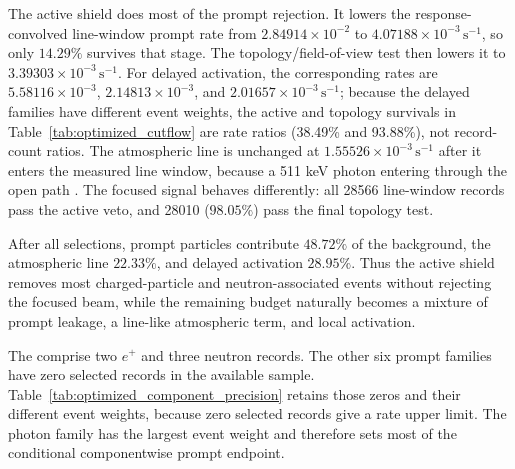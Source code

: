 \documentclass[11pt]{article}
\newcommand{\cps}{\ensuremath{\,\mathrm{s^{-1}}}}
\begin{document}
The active shield does most of the prompt rejection. It lowers the response-convolved
line-window prompt rate from $2.84914\times10^{-2}$ to
$4.07188\times10^{-3}\cps$, so only $14.29\%$ survives that stage. The topology/field-of-view test then lowers
it to $3.39303\times10^{-3}\cps$. For delayed activation, the corresponding
rates are $5.58116\times10^{-3}$, $2.14813\times10^{-3}$, and
$2.01657\times10^{-3}\cps$; because the delayed families have different event
weights, the active and topology survivals in Table~\ref{tab:optimized_cutflow}
are rate ratios (38.49\% and 93.88\%), not record-count ratios. The atmospheric line is unchanged at
$1.55526\times10^{-3}\cps$ after it enters the measured line window, because a 511 keV photon entering through the open
path . The focused signal behaves differently:
all 28566 line-window records pass the active veto, and 28010 ($98.05\%$) pass the
final topology test.

After all selections, prompt particles contribute $48.72\%$ of the background,
the atmospheric line $22.33\%$, and delayed activation $28.95\%$. Thus the active
shield removes most charged-particle and neutron-associated events without
rejecting the focused beam, while the remaining budget naturally becomes a mixture
of prompt leakage, a line-like atmospheric term, and local activation.

The  comprise two $e^+$ and three neutron records. The
other six prompt families have zero selected records in the available sample.
Table~\ref{tab:optimized_component_precision} retains those zeros and their
different event weights, because zero selected records give a rate upper limit.
The photon family has the largest event weight and therefore sets most of the
conditional componentwise prompt endpoint.
\end{document}
